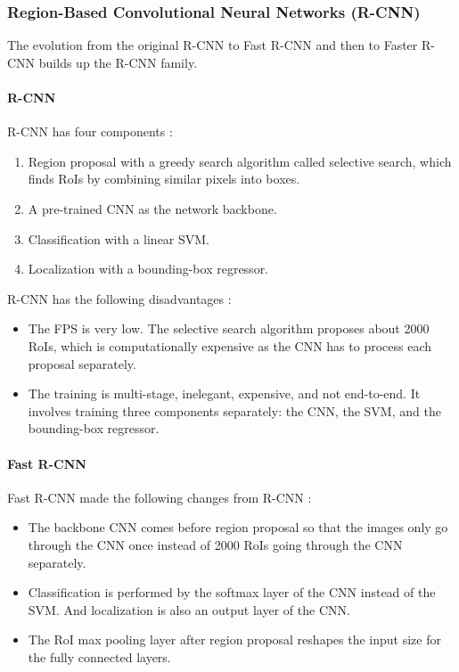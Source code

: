 \documentclass[a4paper, 11pt, oneside]{article}
\begin{document}
\subsubsection{Region-Based Convolutional Neural Networks (R-CNN)}

The evolution from the original R-CNN \cite{girshick2014rich} to Fast R-CNN \cite{girshick2015fast} and then to
Faster R-CNN \cite{ren2015faster} builds up the R-CNN family.

\paragraph{R-CNN}

R-CNN has four components \cite{elgendy2020deep, girshick2014rich}:

\begin{enumerate}
  \item Region proposal with a greedy search algorithm called selective search, which finds RoIs by combining similar
  pixels into boxes.
  \item A pre-trained CNN as the network backbone.
  \item Classification with a linear SVM.
  \item Localization with a bounding-box regressor.
\end{enumerate}

R-CNN has the following disadvantages \cite{elgendy2020deep, girshick2014rich, girshick2015fast}:

\begin{itemize}
  \item The FPS is very low. The selective search algorithm proposes about 2000 RoIs, which is computationally
  expensive as the CNN has to process each proposal separately.
  \item The training is multi-stage, inelegant, expensive, and not end-to-end. It involves training three components
  separately: the CNN, the SVM, and the bounding-box regressor.
\end{itemize}

\paragraph{Fast R-CNN}

Fast R-CNN made the following changes from R-CNN \cite{elgendy2020deep, girshick2015fast}:

\begin{itemize}
  \item The backbone CNN comes before region proposal so that the images only go through the CNN once instead
  of 2000 RoIs going through the CNN separately.
  \item Classification is performed by the softmax layer of the CNN instead of the SVM. And localization is also an output
  layer of the CNN.
  \item The RoI max pooling layer after region proposal reshapes the input size for the fully connected layers.
\end{itemize}
\end{document}
